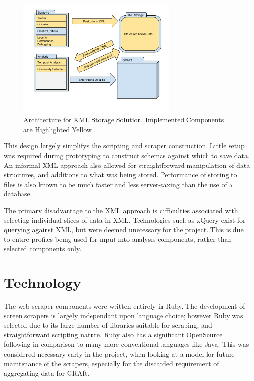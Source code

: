 \begin{figure}[h!]
\centering
\includegraphics[width=0.7\textwidth]{Images/XML_Storage_Architecture.pdf}
\caption{Architecture for XML Storage Solution. Implemented Components are Highlighted Yellow}
\end{figure}
This design largely simplifys the scripting and scraper construction. Little setup was required during prototyping to construct schemas against which to save data. An informal XML approach also allowed for straightforward manipulation of data structures, and additions to what was being stored. Performance of storing to files is also known to be much faster and less server-taxing than the use of a database.

The primary disadvantage to the XML approach is difficulties associated with selecting individual slices of data in XML. Technologies such as xQuery exist for querying against XML, but were deemed unecessary for the project. This is due to entire profiles being used for input into analysis components, rather than selected components only.

\section{Technology}

The web-scraper components were written entirely in Ruby. The development of screen scrapers is largely independant upon language choice; however Ruby was selected due to its large number of libraries suitable for scraping, and straightforward scripting nature. Ruby also has a significant OpenSource following in comparison to many more conventional languages like Java. This was considered necessary early in the project, when looking at a model for future maintenance of the scrapers, especially for the discarded requirement of aggregating data for GRAft. 

